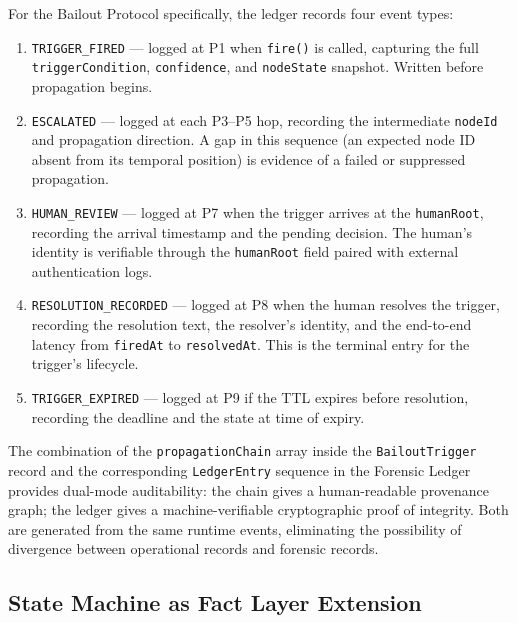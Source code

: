 For the Bailout Protocol specifically, the ledger records four event types:

\begin{enumerate}
  \item \texttt{TRIGGER\_FIRED} --- logged at P1 when \texttt{fire()} is called,
        capturing the full \texttt{triggerCondition}, \texttt{confidence}, and
        \texttt{nodeState} snapshot.  Written before propagation begins.
  \item \texttt{ESCALATED} --- logged at each P3--P5 hop, recording the
        intermediate \texttt{nodeId} and propagation direction.  A gap in this
        sequence (an expected node ID absent from its temporal position) is
        evidence of a failed or suppressed propagation.
  \item \texttt{HUMAN\_REVIEW} --- logged at P7 when the trigger arrives at the
        \texttt{humanRoot}, recording the arrival timestamp and the pending
        decision.  The human's identity is verifiable through the
        \texttt{humanRoot} field paired with external authentication logs.
  \item \texttt{RESOLUTION\_RECORDED} --- logged at P8 when the human resolves
        the trigger, recording the resolution text, the resolver's identity,
        and the end-to-end latency from \texttt{firedAt} to \texttt{resolvedAt}.
        This is the terminal entry for the trigger's lifecycle.
  \item \texttt{TRIGGER\_EXPIRED} --- logged at P9 if the TTL expires before
        resolution, recording the deadline and the state at time of expiry.
\end{enumerate}

The combination of the \texttt{propagationChain} array inside the
\texttt{BailoutTrigger} record and the corresponding \texttt{LedgerEntry}
sequence in the Forensic Ledger provides dual-mode auditability: the chain
gives a human-readable provenance graph; the ledger gives a machine-verifiable
cryptographic proof of integrity.  Both are generated from the same runtime
events, eliminating the possibility of divergence between operational records
and forensic records.

\subsection{State Machine as Fact Layer Extension}
\label{sec:state-machine}

